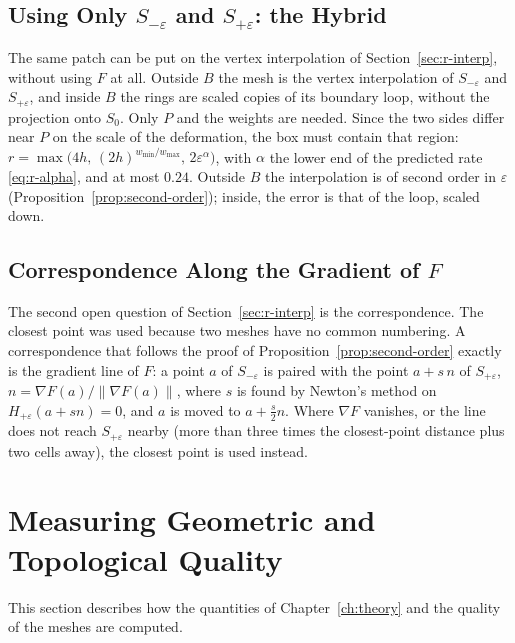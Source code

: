 \documentclass[12pt, a4paper, oneside]{book}
\theoremstyle{plain}
\theoremstyle{definition}
\theoremstyle{remark}
\theoremstyle{definition}
\begin{document}
\subsection{Using Only $S_{-\varepsilon}$ and $S_{+\varepsilon}$: the Hybrid}
\label{sec:r-cone-hybrid}

The same patch can be put on the vertex interpolation of Section~\ref{sec:r-interp}, without using $F$ at all. Outside $B$ the mesh is the vertex interpolation of $S_{-\varepsilon}$ and $S_{+\varepsilon}$, and inside $B$ the rings are scaled copies of its boundary loop, without the projection onto $S_0$. Only $P$ and the weights are needed. Since the two sides differ near $P$ on the scale of the deformation, the box must contain that region: $r=\max\big(4h,\,(2h)^{w_{\min}/w_{\max}},\,2\varepsilon^{\alpha}\big)$, with $\alpha$ the lower end of the predicted rate \eqref{eq:r-alpha}, and at most $0.24$. Outside $B$ the interpolation is of second order in $\varepsilon$ (Proposition~\ref{prop:second-order}); inside, the error is that of the loop, scaled down.

\subsection{Correspondence Along the Gradient of $F$}
\label{sec:r-cone-normal}

The second open question of Section~\ref{sec:r-interp} is the correspondence. The closest point was used because two meshes have no common numbering. A correspondence that follows the proof of Proposition~\ref{prop:second-order} exactly is the gradient line of $F$: a point $a$ of $S_{-\varepsilon}$ is paired with the point $a+s\,n$ of $S_{+\varepsilon}$, $n=\nabla F(a)/\|\nabla F(a)\|$, where $s$ is found by Newton's method on $H_{+\varepsilon}(a+sn)=0$, and $a$ is moved to $a+\tfrac s2n$. Where $\nabla F$ vanishes, or the line does not reach $S_{+\varepsilon}$ nearby (more than three times the closest-point distance plus two cells away), the closest point is used instead.

\section{Measuring Geometric and Topological Quality}
\label{sec:r-method}

This section describes how the quantities of Chapter~\ref{ch:theory} and the quality of the meshes are computed.
\end{document}
